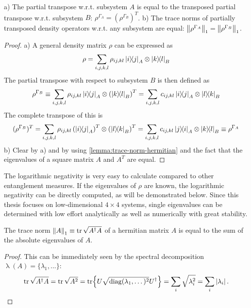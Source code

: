 \begin{proposition}
  a) The partial transpose w.r.t. subsystem $A$ is equal to the transposed partial transpose w.r.t. subsystem $B$: $\rho^{\Gamma_A} = (\rho^{\Gamma_B})^T$. 
  b) The trace norms of partially transposed density operators w.r.t. any subsystem are equal: $\left\lVert\rho^{\Gamma_A}\right\rVert_1 = \left\lVert\rho^{\Gamma_B}\right\rVert_1$.
\end{proposition}
\begin{proof}
  a) A general density matrix $\rho$ can be expressed as
  \begin{equation*}
    \rho = \sum_{i,j,k,l} \rho_{ij,kl} \ketbra{i}{j}_A\otimes\ketbra{k}{l}_B
  \end{equation*}
  The partial transpose with respect to subsystem $B$ is then defined as 
  \begin{equation*}
    \rho^{\Gamma_B} \equiv \sum_{i,j,k,l} \rho_{ij,kl} \ketbra{i}{j}_A\otimes\left(\ketbra{k}{l}_B\right)^T = \sum_{i,j,k,l} c_{ij,kl} \ketbra{i}{j}_A\otimes\ketbra{l}{k}_B
  \end{equation*}
  The complete transpose of this is
  \begin{equation*}
    (\rho^{\Gamma_B})^T = \sum_{i,j,k,l} \rho_{ij,kl} \left(\ketbra{i}{j}_A\right)^T\otimes\left(\ketbra{l}{k}_B\right)^T = \sum_{i,j,k,l} c_{ij,kl} \ketbra{j}{i}_A\otimes\ketbra{k}{l}_B \equiv \rho^{\Gamma_A}
  \end{equation*}
  b) Clear by a) and by using \cref{lemma:trace-norm-hermitian} and the fact that the eigenvalues of a square matrix $A$ and $A^T$ are equal.
\end{proof}

The logarithmic negativity is very easy to calculate compared to other entanglement measures.
If the eigenvalues of $\rho$ are known, the logarithmic negativity can be directly computed, as will be demonstrated below. Since this thesis focuses on low-dimensional $4 \times 4$ systems, single eigenvalues can be determined with low effort analytically as well as numerically with great stability.

\begin{lemma}\label{lemma:trace-norm-hermitian}
  The trace norm $\left\lVert A\right\rVert_1 \equiv \tr \sqrt{A^\dagger A}$ of a hermitian matrix $A$ is equal to the sum of the absolute eigenvalues of $A$.
\end{lemma}
\begin{proof}
  This can be immediately seen by the spectral decomposition $\operatorname{\lambda}(A) = \{\lambda_1,...\}$:
  \begin{equation*}
    \tr \sqrt{A^\dagger A} = \tr \sqrt{A^2} = \tr{U\sqrt{\operatorname{diag}(\lambda_1, \dots)^2}U^\dagger} = \sum_i \sqrt{\lambda_i^2} = \sum_i \left\lvert\lambda_i\right\rvert.
  \end{equation*}
\end{proof}

